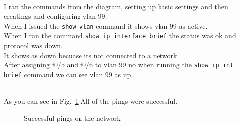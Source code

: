 \documentclass[../EngineeringJournal_CDavis.tex]{subfiles}
\begin{document}
\noindent{}\\
I ran the commands from the diagram, setting up basic settings and then
creatings and configuring vlan 99. 
\\When I issued the {\scriptsize{\verb$show vlan$}\normalsize} command 
it shows vlan 99 as active.
\\ When I ran the command {\scriptsize{\verb$show ip interface brief$}\normalsize} 
the status was ok and protocol was down. 
\\It shows as down becuase its not connected to a network.
\\After assigning f0/5 and f0/6 to vlan 99 no when running
the {\scriptsize{\verb$show ip int brief$}\normalsize} command
we can see vlan 99 as up.



\noindent{}\\
As you can see in Fig.~\ref{Ping10} All of the pings were successful.



\begin{figure}[!hbt]\centering
{}\hfill
{}\par 
{}
\caption{Successful pings on the network}\label{Ping10}
\end{figure}
\end{document}
